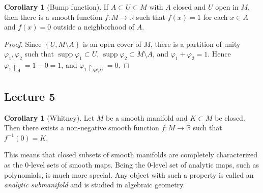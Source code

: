 \documentclass[10pt,letterpaper,cm]{nupset}
\theoremstyle{definition}
\theoremstyle{theorem}
\newtheorem{corollary}[definition]{Corollary}
\theoremstyle{remark}
\newcommand{\R}{\mathbb R}
\newcommand{\1}{\mathbf{1}}
\newcommand{\0}{\vec 0}
\DeclareMathOperator{\supp}{supp}
\begin{document}
\begin{corollary}[Bump function]
If $A \subset U \subset M$ with $A$ closed and $U$ open in $M$, then there is a  smooth function $f: M \to \R$ such that $f(x) = 1$ for each $x\in A$ and $f(x) =0$ outside a neighborhood of $A$.
\end{corollary}

\begin{proof}
Since $\left\{U, M \setminus A\right\}$ is an open cover of $M$, there is a partition of unity $\varphi_1, \varphi_2$ such that $\supp \varphi_1 \subset U$, $\supp \varphi_2 \subset M \setminus A$, and $\varphi_1 + \varphi_2 = 1$. Hence $\varphi_1 \restriction_A = 1 - 0 = 1$, and $\varphi_1 \restriction_{M\setminus U} = 0$.
\end{proof}

\subsection{Lecture 5}

\begin{corollary}[Whitney]
Let $M$ be a smooth manifold and $K \subset M$ be closed. Then there exists a non-negative smooth function $f: M \to \R$ such that $f^{-1}(0) =K$.
\end{corollary}

This means that closed subsets of smooth manifolds are completely characterized as the $0$-level sets of smooth maps. Being the $0$-level set of analytic maps, such as polynomials, is much more special. Any object with such a property is called an \textit{analytic submanifold} and is studied in algebraic geometry.
\end{document}
